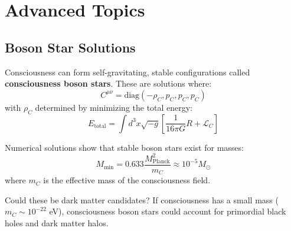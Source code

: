\section{Advanced Topics}

\begin{advanced}
\subsection{Boson Star Solutions}

Consciousness can form self-gravitating, stable configurations called \textbf{consciousness boson stars}. These are solutions where:
\begin{equation}
C^{\mu\nu} = \text{diag}(-\rho_C, p_C, p_C, p_C)
\end{equation}
with $\rho_C$ determined by minimizing the total energy:
\begin{equation}
E_{\text{total}} = \int d^3x \sqrt{-g} \left[ \frac{1}{16\pi G}R + \mathcal{L}_C \right]
\end{equation}

Numerical solutions show that stable boson stars exist for masses:
\begin{equation}
M_{\text{min}} = 0.633 \frac{M_{\text{Planck}}^2}{m_C} \approx 10^{-5} M_\odot
\end{equation}
where $m_C$ is the effective mass of the consciousness field.

Could these be dark matter candidates? If consciousness has a small mass ($m_C \sim 10^{-22}$ eV), consciousness boson stars could account for primordial black holes and dark matter halos.
\end{advanced}

